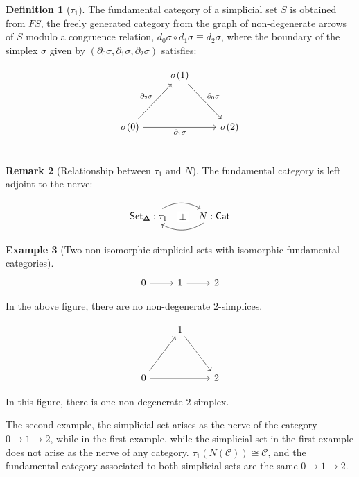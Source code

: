 \documentclass[10pt]{amsart}
\newcommand{\8}{\ensuremath{\infty}}
\newcommand{\0}{\ensuremath{\overset{\rightarrow}{0}}}
\newcommand{\1}{\ensuremath{\mathbf{1}}}
\newcommand{\C}{\ensuremath{\mathscr{C}}}
\newcommand{\Cat}{\ensuremath{\mathsf{Cat}}}
\newcommand{\SSet}{\ensuremath{\mathsf{Set}_{\boldsymbol{\Delta}}}}
\theoremstyle{definition}
\newtheorem{definition}{Definition}[section]
\newtheorem{remark}[definition]{Remark}
\newtheorem{example}[definition]{Example}
\numberwithin{definition}{subsection}
\numberwithin{definition}{section}
\begin{document}
\begin{definition}[$\tau_1$]
  The fundamental category of a simplicial set $S$ is obtained from $FS$, the freely generated category from the graph of non-degenerate arrows of $S$ modulo a congruence relation, $d_0 \sigma \circ d_1 \sigma \equiv d_2 \sigma$, where the boundary of the simplex $\sigma$ given by $(\partial_0 \sigma, \partial_1 \sigma, \partial_2 \sigma)$ satisfies:

  \begin{equation*}
    \begin{tikzcd}
      & \sigma(1) \arrow[ddr, "\partial_0 \sigma"] & \\
      \\
      \sigma(0) \arrow[uur, "\partial_2 \sigma"] \arrow[rr, "\partial_1 \sigma"'] & & \sigma(2) \\
    \end{tikzcd}
  \end{equation*}
\end{definition}

\begin{remark}[Relationship between $\tau_1$ and $N$]
  The fundamental category is left adjoint to the nerve:

  \begin{equation*}
    \begin{tikzcd}
      \SSet : \tau_1 \arrow[r, bend left] \arrow[r, phantom, "\bot" description] & N : \Cat \arrow[l, bend left]
    \end{tikzcd}
  \end{equation*}
\end{remark}

\begin{example}[Two non-isomorphic simplicial sets with isomorphic fundamental categories]

  \begin{equation*}
    \begin{tikzcd}
      0 \arrow[r] & 1 \arrow[r] & 2
    \end{tikzcd}
  \end{equation*}

  In the above figure, there are no non-degenerate $2$-simplices.

  \begin{equation*}
    \begin{tikzcd}
      & 1 \arrow[ddr] & \\
      \\
      0 \arrow[uur] \arrow[rr] & & 2
    \end{tikzcd}
  \end{equation*}

  In this figure, there is one non-degenerate $2$-simplex.

  The second example, the simplicial set arises as the nerve of the category $0 \rightarrow 1 \rightarrow 2$, while in the first example, while the simplicial set in the first example does not arise as the nerve of any category. $\tau_1(N(\C)) \cong \C$, and the fundamental category associated to both simplicial sets are the same $0 \rightarrow 1 \rightarrow 2$.
\end{example}
\end{document}
